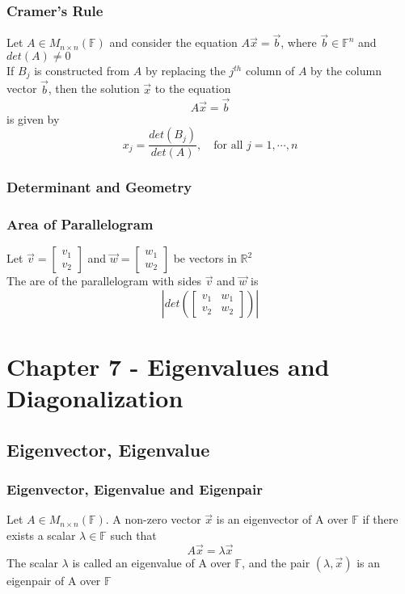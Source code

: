 \documentclass[12pt, letterpaper]{article}
\begin{document}
\subsubsection{Cramer's Rule}
Let $A\in M_{n\times n}(\mathbb{F})$ and consider the equation $A\vec{x}=\vec{b}$, where $\vec{b}\in\mathbb{F}^n$ and $det(A)\neq 0$ \\
If $B_j$ is constructed from $A$ by replacing the $j^{th}$ column of $A$ by the column vector $\vec{b}$, then the solution $\vec{x}$ to the equation \[A\vec{x}=\vec{b}\]
is given by \[x_j = \frac{det(B_j)}{det(A)},\quad \text{for all $j=1, \cdots, n$}\]
\subsubsection{Determinant and Geometry}
\subsubsection*{Area of Parallelogram}
Let $\vec{v} = \begin{bmatrix} v_1 \\ v_2 \end{bmatrix}$ and $\vec{w} = \begin{bmatrix} w_1 \\ w_2 \end{bmatrix}$ be vectors in $\mathbb{R}^2$ \\
The are of the parallelogram with sides $\vec{v}$ and $\vec{w}$ is 
\[|det(\begin{bmatrix} v_1 &w_1 \\ v_2 &w_2 \end{bmatrix})|\]

\section{Chapter 7 - Eigenvalues and Diagonalization}
\subsection{Eigenvector, Eigenvalue}
\subsubsection{Eigenvector, Eigenvalue and Eigenpair}
Let $A\in M_{n\times n}(\mathbb{F})$. A non-zero vector $\vec{x}$ is an eigenvector of A over $\mathbb{F}$ if there 
exists a scalar $\lambda\in\mathbb{F}$ such that \[A\vec{x} = \lambda\vec{x}\]
The scalar $\lambda$ is called an eigenvalue of A over $\mathbb{F}$, and the pair 
$(\lambda, \vec{x})$ is an eigenpair of A over $\mathbb{F}$
\end{document}
